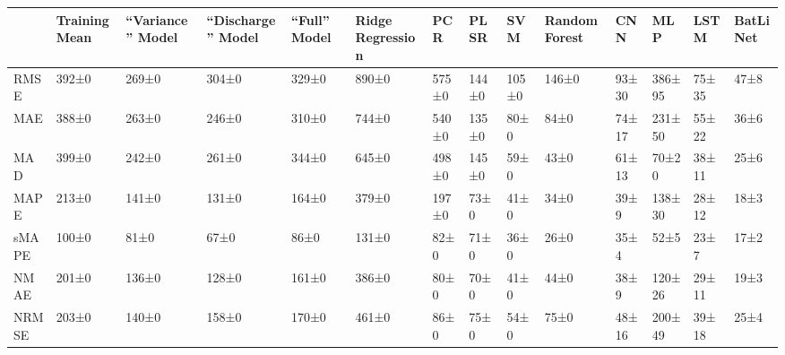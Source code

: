\begin{tabular}{llllllllllllll}
\toprule
 & Training Mean & ``Variance'' Model & ``Discharge'' Model & ``Full'' Model & Ridge Regression & PCR & PLSR & SVM & Random Forest & CNN & MLP & LSTM & BatLiNet \\
\midrule
RMSE & 392±0 & 269±0 & 304±0 & 329±0 & 890±0 & 575±0 & 144±0 & 105±0 & 146±0 & 93±30 & 386±95 & 75±35 & 47±8 \\
MAE & 388±0 & 263±0 & 246±0 & 310±0 & 744±0 & 540±0 & 135±0 & 80±0 & 84±0 & 74±17 & 231±50 & 55±22 & 36±6 \\
MAD & 399±0 & 242±0 & 261±0 & 344±0 & 645±0 & 498±0 & 145±0 & 59±0 & 43±0 & 61±13 & 70±20 & 38±11 & 25±6 \\
MAPE & 213±0 & 141±0 & 131±0 & 164±0 & 379±0 & 197±0 & 73±0 & 41±0 & 34±0 & 39±9 & 138±30 & 28±12 & 18±3 \\
sMAPE & 100±0 & 81±0 & 67±0 & 86±0 & 131±0 & 82±0 & 71±0 & 36±0 & 26±0 & 35±4 & 52±5 & 23±7 & 17±2 \\
NMAE & 201±0 & 136±0 & 128±0 & 161±0 & 386±0 & 80±0 & 70±0 & 41±0 & 44±0 & 38±9 & 120±26 & 29±11 & 19±3 \\
NRMSE & 203±0 & 140±0 & 158±0 & 170±0 & 461±0 & 86±0 & 75±0 & 54±0 & 75±0 & 48±16 & 200±49 & 39±18 & 25±4 \\
\bottomrule
\end{tabular}
